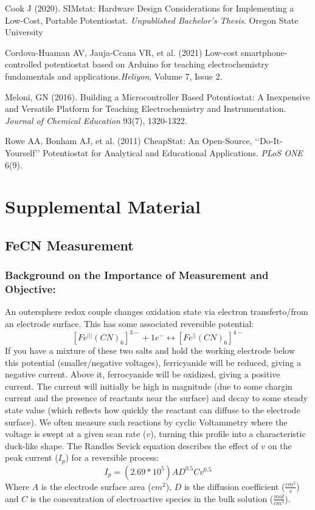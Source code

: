 \documentclass{article}
\begin{document}
Cook J (2020). SIMstat: Hardware Design Considerations for Implementing a Low-Cost, Portable Potentiostat. \emph{Unpublished Bachelor's Thesis}. Oregon State University

Cordova-Huaman AV, Jauja-Ccana VR, et al. (2021) Low-cost smartphone-controlled potentiostat based on Arduino for teaching electrochemistry fundamentals and applications.\emph{Heliyon}, Volume 7, Issue 2. 

Meloni, GN (2016). Building a Microcontroller Based Potentiostat: A Inexpensive and Versatile Platform for Teaching Electrochemistry and Instrumentation. \emph{Journal of Chemical Education} 93(7), 1320-1322. 

Rowe AA, Bonham AJ, et al. (2011) CheapStat: An Open-Source, ‘‘Do-It-Yourself’’ Potentiostat for Analytical and Educational Applications. \emph{PLoS ONE} 6(9).

\newpage
\section*{Supplemental Material}
\subsection*{FeCN Measurement}
\subsubsection*{Background on the Importance of Measurement and Objective:}
An outersphere redox couple changes oxidation state via electron transferto/from an electrode surface. This has some associated reversible potential:
\[ [Fe^{|||}(CN)_6]^{3-} + 1e^- \leftrightarrow [Fe^{||}(CN)_6]^{4-}\]
If you have a mixture of these two salts and hold the working electrode below this potential (smaller/negative voltages), ferricyanide will be reduced, giving a negative current. Above it, ferrocyanide will be oxidized, giving a positive current. The current will initially be high in magnitude (due to some chargin current and the presence of reactants near the surface) and decay to some steady state value (which reflects how quickly the reactant can diffuse to the electrode surface). We often measure such reactions by cyclic Voltammetry where the voltage is swept at a given scan rate ($v$), turning this profile into a characteristic duck-like shape. The Randles Sevick equation describes the effect of $v$ on the peak current ($I_p$) for a reversible process:
\[ I_p = (2.69*10^5) AD^{0.5}Cv^{0.5}\]
Where $A$ is the electrode surface area ($cm^2$), $D$ is the diffusion coefficient ($\frac{cm^2}{s}$) and $C$ is the concentration of electroactive species in the bulk solution ($\frac{mol}{cm^3}$).
\end{document}
